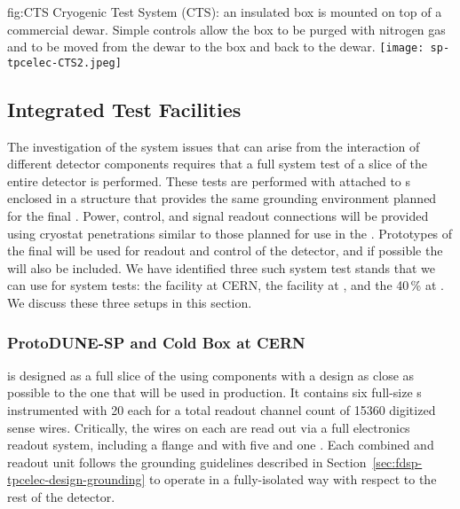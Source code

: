 \begin{dunefigure}
{fig:CTS}
{Cryogenic Test System (CTS): an insulated box is mounted on top of a commercial \lntwo dewar.  Simple controls allow the box to be purged with nitrogen gas and \lntwo to be moved from the dewar to the box and back to the dewar.}
\texttt{[image: sp-tpcelec-CTS2.jpeg]}
\end{dunefigure}


\subsection{Integrated Test Facilities}
\label{sec:fdsp-tpcelec-qa-facilities}

The investigation of the system issues that can arise from the interaction 
of different detector components requires that a full system test of a slice
of the entire detector is performed. These tests are performed with 
attached to s enclosed in a structure that provides the same
grounding environment planned for the final  . 
Power, control, and signal readout connections will be provided using cryostat 
penetrations similar to those planned for use in the  .
Prototypes of the final    will be used for readout and
control of the detector, and if possible the  will also be included.
We have identified three such system test stands
that we can use for system tests: the  facility at CERN, the
 facility at , and the \num{40}\,\%  at .
We discuss these three setups in this section.

\subsubsection{ProtoDUNE-SP and Cold Box at CERN}
\label{sec:fdsp-tpcelec-qa-facilities-pdune}

 is designed as a full slice of the     
using components with a design as close as possible to the one that will
be used in production. It contains six full-size 
 s instrumented with \num{20}  each for a 
total readout channel count of \num{15360} digitized sense wires. Critically, 
the wires on each  are read out via a full  electronics readout 
system, including a  flange and  with five  
and one . Each combined  and  readout unit follows 
the grounding guidelines described in Section~\ref{sec:fdsp-tpcelec-design-grounding} 
to operate in a fully-isolated way with respect to the rest of the detector.

